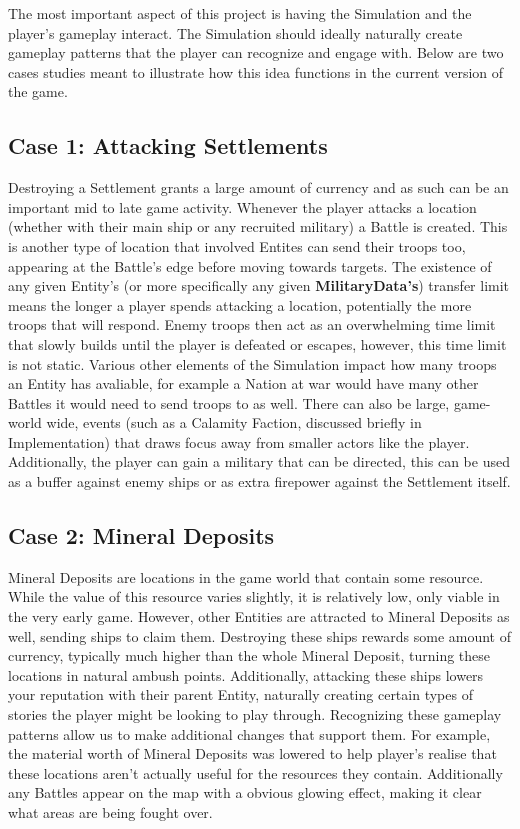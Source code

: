 \documentclass{report}
\begin{document}
The most important aspect of this project is having the Simulation and the player's gameplay interact. The Simulation should ideally naturally create gameplay patterns that the player can recognize and engage with. Below are two cases studies meant to illustrate how this idea functions in the current version of the game.

\subsection{Case 1: Attacking Settlements}

Destroying a Settlement grants a large amount of currency and as such can be an important mid to late game activity. Whenever the player attacks a location (whether with their main ship or any recruited military) a Battle is created. This is another type of location that involved Entites can send their troops too, appearing at the Battle's edge before moving towards targets. The existence of any given Entity's (or more specifically any given \textbf{MilitaryData's}) transfer limit means the longer a player spends attacking a location, potentially the more troops that will respond. Enemy troops then act as an overwhelming time limit that slowly builds until the player is defeated or escapes, however, this time limit is not static. Various other elements of the Simulation impact how many troops an Entity has avaliable, for example a Nation at war would have many other Battles it would need to send troops to as well. There can also be large, game-world wide, events (such as a Calamity Faction, discussed briefly in Implementation) that draws focus away from smaller actors like the player. Additionally, the player can gain a military that can be directed, this can be used as a buffer against enemy ships or as extra firepower against the Settlement itself.

\subsection{Case 2: Mineral Deposits}

Mineral Deposits are locations in the game world that contain some resource. While the value of this resource varies slightly, it is relatively low, only viable in the very early game. However, other Entities are attracted to Mineral Deposits as well, sending ships to claim them. Destroying these ships rewards some amount of currency, typically much higher than the whole Mineral Deposit, turning these locations in natural ambush points. Additionally, attacking these ships lowers your reputation with their parent Entity, naturally creating certain types of stories the player might be looking to play through.
\newline
\newline
Recognizing these gameplay patterns allow us to make additional changes that support them. For example, the material worth of Mineral Deposits was lowered to help player's realise that these locations aren't actually useful for the resources they contain. Additionally any Battles appear on the map with a obvious glowing effect, making it clear what areas are being fought over.
\end{document}
